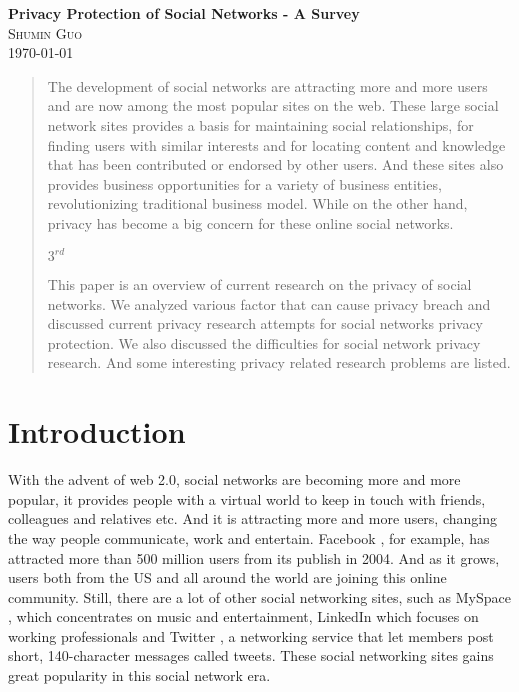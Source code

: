 \documentclass[12pt]{article}
\begin{document}
\begin{center}                  %
\textbf{\Large{Privacy Protection of Social Networks - A Survey}} \\ 
\small\textsc{Shumin Guo} \\
\today
\end{center}

\begin{abstract} 
The development of social networks are attracting more and more
users and are now among the most popular sites on the
web\cite{top-500-sites}.  These large social network sites provides a
basis for maintaining social relationships, for finding users with
similar interests and for locating content and knowledge that has been
contributed or endorsed by other users\cite{measure-analyze-SN}.
And these sites also provides business opportunities for a 
variety of business entities, revolutionizing traditional business
model. While on the other hand, privacy has become a big concern for
these online social networks. 


$3^{rd}$

This paper is an overview of current research on the privacy of social
networks. We analyzed various factor that can cause privacy breach
and discussed current privacy research attempts for social networks
privacy protection. We also discussed the difficulties for social
network privacy research. And some interesting privacy related
research problems are listed. 
\end{abstract} 

\section{Introduction}
With the advent of web 2.0, social networks are becoming more and more
popular, it provides people with a virtual world to keep in touch with
friends, colleagues and relatives etc. And it is attracting more and
more users, changing the way people communicate, work and
entertain. Facebook \cite{poke-facebook}, for example, has attracted more
than 500 million users \cite{facebooksite} from its publish in
2004. And as it grows, users both from the US and all around the
world are joining this online community. Still, there are a lot of
other social networking sites, such as MySpace \cite{myspacesite},
which concentrates on music and entertainment, LinkedIn which focuses
on working professionals and Twitter \cite{twittersite}, a networking
service that let members post short, 140-character messages called
tweets. These social networking sites gains great popularity in this
social network era.
\end{document}
